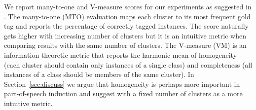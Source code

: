 We report many-to-one and V-measure scores for our experiments as
suggested in \cite{Christodoulopoulos:2010:TDU:1870658.1870714}.  The
many-to-one (MTO) evaluation maps each cluster to its most frequent
gold tag and reports the percentage of correctly tagged instances.
The \mto score naturally gets higher with increasing number of
clusters but it is an intuitive metric when comparing results with the
same number of clusters.  The V-measure (VM) \cite{rosenberg2007v} is
an information theoretic metric that reports the harmonic mean of
homogeneity (each cluster should contain only instances of a single
class) and completeness (all instances of a class should be members of
the same cluster).  In Section~\ref{sec:discuss} we argue that
homogeneity is perhaps more important in part-of-speech induction and
suggest \mto with a fixed number of clusters as a more intuitive
metric.



